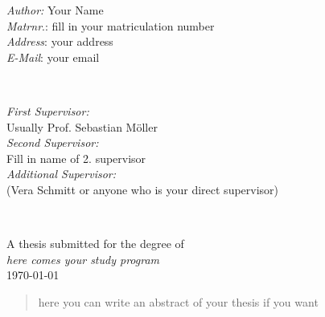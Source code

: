 \begin{titlepage}
\begin{minipage}{0.5\textwidth}
\begin{flushleft} \large
\emph{Author:} Your Name\\
\emph{Matrnr}.: fill in your matriculation number\\
\emph{Address}: your address \\
\emph{E-Mail}: your email\\
\end{flushleft}
\end{minipage}
~
\begin{minipage}{0.43\textwidth}
\begin{flushright} \large
\emph{First Supervisor:} \\
Usually Prof. Sebastian Möller\\
\emph{Second Supervisor:} \\
Fill in name of 2. supervisor\\
\emph{Additional Supervisor:}\\
(Vera Schmitt or anyone who is your direct supervisor)
\end{flushright}
\end{minipage}\\[3cm]
\makeatother




{\large A thesis submitted for the degree of}\\[0.5cm]
{\large \emph{here comes your study program}}\\[0.5cm]
{\large \today}\\[2cm] %

\vfill %
 

\begin{abstract}
\noindent
here you can write an abstract of your thesis if you want
\end{abstract}
\vspace{1cm}


\vfill %

\end{titlepage}

